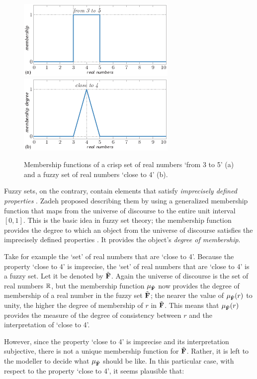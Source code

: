\begin{figure}%
\includegraphics{fig[fuzzySet]a}\hspace*{2mm}\includegraphics{fig[fuzzySet]b}
\caption{Membership functions of a crisp set of real numbers `from 3 to 5' (a) and a fuzzy set of real numbers `close to 4' (b).}
\label{fig:fuzzy:set}
\end{figure}

Fuzzy sets, on the contrary, contain elements that satisfy \emph{imprecisely defined properties} \cite{bezdek:1992}. Zadeh \cite{zadeh:1965} proposed describing them by using a generalized membership function that maps from the universe of discourse to the entire unit interval $[0,1]$. This is the basic idea in fuzzy set theory; the membership function provides the degree to which an object from the universe of discourse satisfies the imprecisely defined properties \cite{bezdek:1992}. It provides the object's \emph{degree of membership}. 

Take for example the `set' of real numbers that are `close to 4'. Because the property `close to 4' is imprecise, the `set' of real numbers that are `close to 4' is a fuzzy set. Let it be denoted by ${\tilde{{\mathbf{F}}}}$. Again the universe of discourse is the set of real numbers $\mathbb{R}$, but the membership function $\mu_{\tilde{{\mathbf{F}}}}$ now provides the degree of membership of a real number in the fuzzy set ${\tilde{{\mathbf{F}}}}$; the nearer the value of $\mu_{\tilde{{\mathbf{F}}}}(r)$ to unity, the higher the degree of membership of $r$ in ${\tilde{{\mathbf{F}}}}$. This means that $\mu_{\tilde{{\mathbf{F}}}}(r)$ provides the measure of the degree of consistency between $r$ and the interpretation of `close to 4'. 

However, since the property `close to 4' is imprecise and its interpretation subjective, there is not a unique membership function for ${\tilde{{\mathbf{F}}}}$. Rather, it is left to the modeller to decide what $\mu_{\tilde{{\mathbf{F}}}}$ should be like. In this particular case, with respect to the property `close to 4', it seems plausible that:

